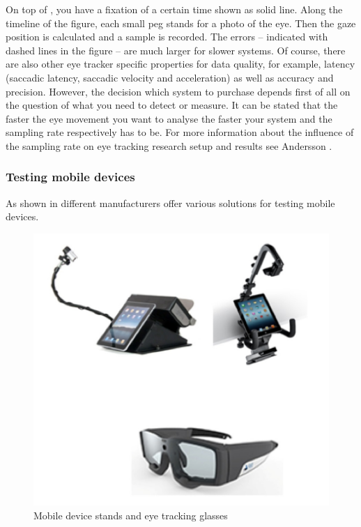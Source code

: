 \documentclass[output=paper]{langsci/langscibook}
\begin{document}
On top of , you have a fixation of a certain time shown as solid line. Along the timeline of the figure, each small peg stands for a photo of the eye. Then the gaze position is calculated and a sample is recorded. The errors -- indicated with dashed lines in the figure -- are much larger for slower systems. Of course, there are also other eye tracker specific properties for data quality, for example, latency (saccadic latency, saccadic velocity and acceleration) as well as accuracy and precision. However, the decision which system to purchase depends first of all on the question of what you need to detect or measure. It can be stated that the faster the eye movement you want to analyse the faster your system and the sampling rate respectively has to be. For more information about the influence of the sampling rate on eye tracking research setup and results see Andersson \citep[cf.][]{Andersson2009}. 

\subsubsection{Testing mobile devices}

As shown in  different manufacturers offer various solutions for testing mobile devices. 

\begin{figure}
 \includegraphics[width=\textwidth]{figures/Roesener5.png}
 \caption{Mobile device stands and eye tracking glasses \citep{Tobii2014, SMI2014}}
 \label{roesener:fig:5}
\end{figure} 
\end{document}
